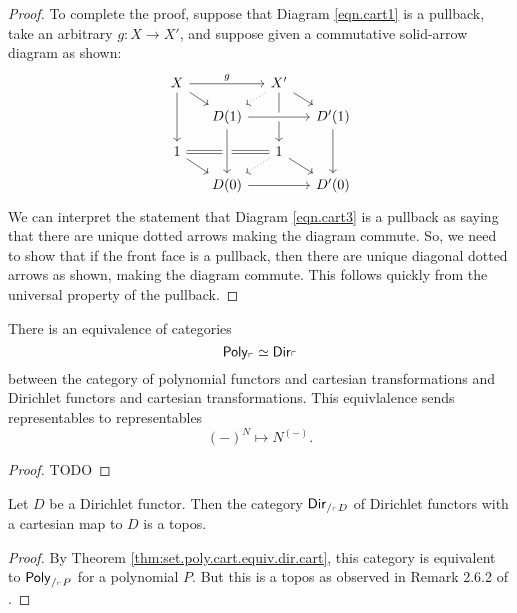 \begin{proof}
To complete the proof, suppose that Diagram \ref{eqn.cart1} is a pullback, take an arbitrary $g\colon X\to X'$, and suppose given a commutative solid-arrow diagram as shown:
\[
\begin{tikzcd}[sep=small]
  X\ar[rr, "g"]\ar[dd]\ar[rd]&&
  X'\ar[dr]\ar[dd]\ar[dl, dotted]\\&
  D(1)\ar[rr, crossing over]&&
  D'(1)\ar[dd]\\
  1\ar[dr]\ar[rr, equal]&&
  1\ar[dr]\ar[dl, dotted]\\&
  D(0)\ar[from=uu, crossing over]\ar[rr]&&
  D'(0)
\end{tikzcd}
\]
We can interpret the statement that Diagram \ref{eqn.cart3} is a pullback as
saying that there are unique dotted arrows making the diagram commute. So, we need to show that if the front face is a pullback, then there are unique diagonal dotted arrows as shown, making the diagram commute. This follows quickly from the universal property of the pullback.
\end{proof}

\begin{thm}\label{thm:set.poly.cart.equiv.dir.cart}
  There is an equivalence of categories
  $$\mathsf{{Poly}}_{\ulcorner} \simeq \operatorname{\mathsf{{Dir}}}_{\ulcorner}$$
  between the category of polynomial functors and cartesian transformations and
  Dirichlet functors and cartesian transformations. This equivlalence sends
  representables to representables
  $$(-)^N \mapsto N^{(-)}.$$
\end{thm}
\begin{proof}
TODO
\end{proof}

\begin{cor}
  Let $D$ be a Dirichlet functor. Then the category
  $\operatorname{\mathsf{{Dir}}}_{/_{\ulcorner} D}$
  of Dirichlet functors with a cartesian map to $D$ is a topos.
\end{cor}
\begin{proof}
By Theorem \ref{thm:set.poly.cart.equiv.dir.cart}, this category is equivalent
to $\mathsf{{Poly}}_{/_{\ulcorner} P}$ for a polynomial $P$. But this is a topos as
observed in Remark 2.6.2 of \cite{GHK:Analytic.Monads}.
\end{proof}

